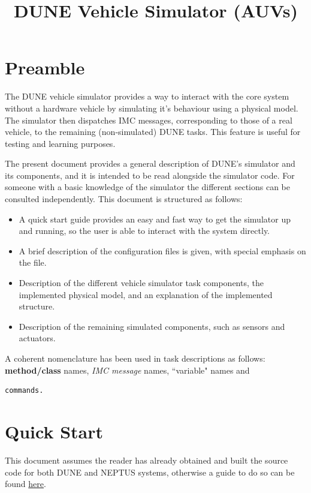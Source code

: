 \documentclass[10pt,a4paper]{article}
\begin{document}
\title{DUNE Vehicle Simulator (AUVs)}
\maketitle

\tableofcontents
\newpage

\section{Preamble}
The DUNE vehicle simulator provides a way to interact with the core system without a hardware vehicle by simulating it's behaviour using a physical model. The simulator then dispatches IMC messages, corresponding to those of a real vehicle, to the remaining (non-simulated) DUNE tasks. This feature is useful for testing and learning purposes.
 
\par The present document provides a general description of DUNE's simulator and its components, and it is intended to be read alongside the simulator code. For someone with a basic knowledge of the simulator the different sections can be consulted independently. This document is structured as follows:

\begin{itemize}
\item A quick start guide provides an easy and fast way to get the simulator up and running, so the user is able to interact with the system directly.
\item A brief description of the configuration files is given, with special emphasis on the  file.
\item Description of the different vehicle simulator task components, the implemented physical model, and an explanation of the implemented structure.
\item Description of the remaining simulated components, such as sensors and actuators.
\end{itemize}

A coherent nomenclature has been used in task descriptions as follows: \textbf{method/class} names, \textit{IMC message} names, ``variable" names  and
\begin{lstlisting}[language=bash, frame=single]
  commands.
\end{lstlisting}

\section{Quick Start}
This document assumes the reader has already obtained and built the source code for both DUNE and NEPTUS systems, otherwise a guide to do so can be found \href{https://github.com/LSTS/dune/wiki}{here}.
\end{document}
